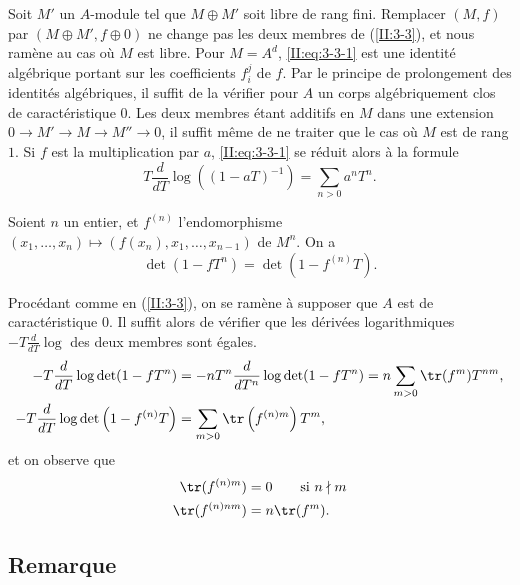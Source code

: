 Soit $M'$ un $A$-module tel que $M\oplus M'$ soit libre de rang fini. 
Remplacer $(M,f)$ par $(M\oplus M',f\oplus 0)$ ne change pas les deux membres 
de (\ref{II:3-3}), et nous ramène au cas où $M$ est libre. Pour $M=A^d$, 
\eqref{II:eq:3-3-1} est une identité algébrique portant sur les coefficients 
$f_i^j$ de $f$. Par le principe de prolongement des identités algébriques, 
il suffit de la vérifier pour $A$ un corps algébriquement clos de 
caractéristique $0$. Les deux membres étant additifs en $M$ dans une 
extension $0\to M'\to M\to M''\to 0$, il suffit même de ne traiter que le cas 
où $M$ est de rang $1$. Si $f$ est la multiplication par $a$, 
\eqref{II:eq:3-3-1} se réduit alors à la formule 
\[
  T\frac{d}{dT}\log\left((1-a T)^{-1}\right) = \sum_{n>0} a^n T^n \text{.}
\]





\begin{corollary_}\label{II:3-4}
Soient $n$ un entier, et $f^{(n)}$ l'endomorphisme 
$(x_1,\dotsc,x_n)\mapsto \left(f(x_n),x_1,\dotsc,x_{n-1}\right)$ de $M^n$. 
On a 
\begin{equation*}\tag{3.4.1}\label{II:eq:3-4-1}
  \det(1-f T^n) = \det(1-f^{(n)} T) \text{.}
\end{equation*}
\end{corollary_}

Procédant comme en (\ref{II:3-3}), on se ramène à supposer que $A$ est de 
caractéristique $0$. Il suffit alors de vérifier que les dérivées 
logarithmiques $-T\frac{d}{dT}\log$ des deux membres sont égales. 
\begin{align*}
  -T\frac{d}{dT}\log\det(1-f T^n) &= - n T^n \frac{d}{dT^n} \log\det(1-f T^n) = n \sum_{m>0} \tr(f^m) T^{n m} \text{,} \\
  -T \frac{d}{dT}\log\det\left(1-f^{(n)} T\right) &= \sum_{m>0} \tr\left(f^{(n) m}\right) T^m \text{,}
\end{align*}
et on observe que 
\begin{align*}
  \tr(f^{(n) m}) &= 0 \qquad \text{si $n\nmid m$} \\
  \tr(f^{(n) n m}) &= n \tr(f^m) \text{.}
\end{align*}





\subsection{Remarque}\label{II:3-5}

